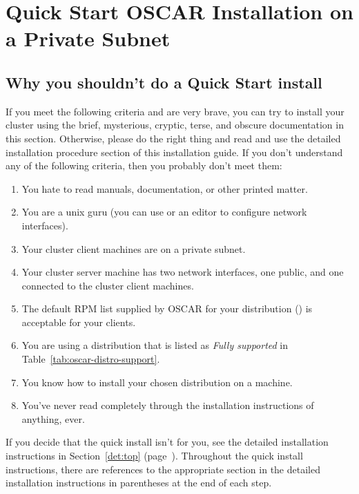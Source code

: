 %
%
%

\section{Quick Start OSCAR Installation on a Private Subnet}


\subsection{Why you shouldn't do a Quick Start install}

If you meet the following criteria and are very brave, you can try to
install your cluster using the brief, mysterious, cryptic, terse, and
obscure documentation in this section.  Otherwise, please do the right
thing and read and use the detailed installation procedure section of
this installation guide.  If you don't understand any of the following
criteria, then you probably don't meet them:

\begin{enumerate}
\item You hate to read manuals, documentation, or other printed
  matter.
\item You are a unix guru (you can use  or an editor to
  configure network interfaces).
\item Your cluster client machines are on a private subnet.
\item Your cluster server machine has two network interfaces, one
  public, and one connected to the cluster client machines.
\item The default RPM list supplied by OSCAR for your distribution
  ()
  is acceptable for your clients.
\item You are using a distribution that is listed as \emph{Fully
    supported} in Table~\ref{tab:oscar-distro-support}.
\item You know how to install your chosen distribution on a machine.
\item You've never read completely through the installation
  instructions of anything, ever.
\end{enumerate}

If you decide that the quick install isn't for you, see the detailed
installation instructions in Section~\ref{det:top}
(page~\pageref{det:top}). Throughout the quick install instructions,
there are references to the appropriate section in the detailed
installation instructions in parentheses at the end of each step.

